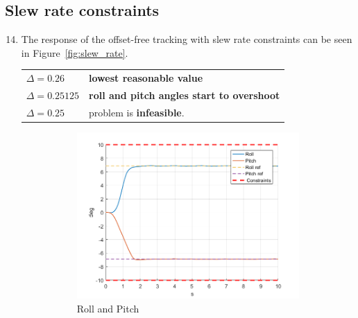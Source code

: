 \documentclass[11pt]{article}
\begin{document}


\subsection*{Slew rate constraints} %
\label{sub:slew_rate_constraints}

\begin{enumerate}
    \setcounter{enumi}{13}
    \item The response of the offset-free tracking with slew rate constraints can be seen in Figure~\ref{fig:slew_rate}.
            
    \begin{tabular}{ll}
    $\Delta = 0.26$&\textbf{lowest reasonable value}\\    
    $\Delta = 0.25125$&\textbf{roll and pitch angles start to overshoot}\\ 
    $\Delta = 0.25$&problem is \textbf{infeasible}.
    \end{tabular}
    \begin{figure}[ht]
        \centering
        \begin{subfigure}[c]{0.3\linewidth}
            \centering
            \includegraphics[width=\linewidth]{Plots_14_SlewRateConstraints/01}
            \caption{Roll and Pitch}
        \end{subfigure}
        ~
        \begin{subfigure}[c]{0.3\linewidth}
            \centering

\end{subfigure}
\end{figure}
\end{enumerate}
\end{document}

